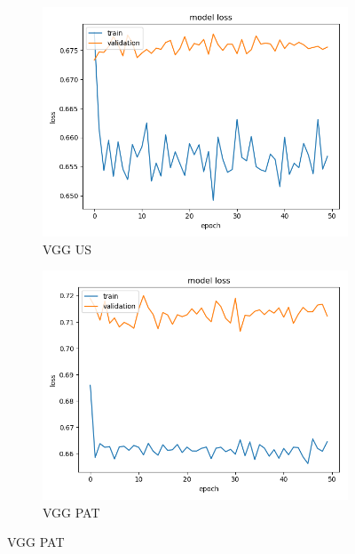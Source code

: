 \begin{figure}
\begin{subfigure}[b]{.45\linewidth}
\includegraphics[width=\linewidth]{Figs/vgg_us_loss.jpg}
\caption{VGG US}
\end{subfigure}
\begin{subfigure}[b]{.45\linewidth}
\includegraphics[width=\linewidth]{Figs/vgg_pat_loss.jpg}
\caption{VGG PAT}
\end{subfigure}


\end{figure}
